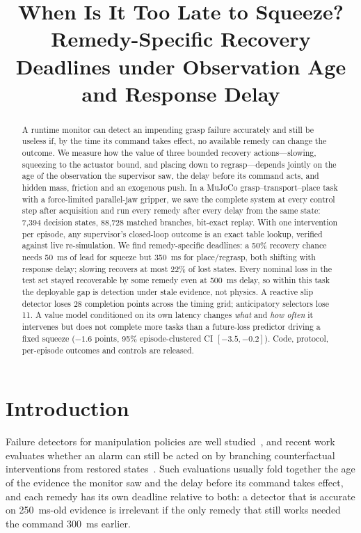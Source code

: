 \documentclass[conference]{IEEEtran}
\begin{document}
\title{When Is It Too Late to Squeeze?\\
Remedy-Specific Recovery Deadlines under Observation Age and Response Delay}

\author{}

\maketitle

\begin{abstract}
A runtime monitor can detect an impending grasp failure accurately and still be useless if, by the time its command takes effect, no available remedy can change the outcome. We measure how the value of three bounded recovery actions---slowing, squeezing to the actuator bound, and placing down to regrasp---depends jointly on the age of the observation the supervisor saw, the delay before its command acts, and hidden mass, friction and an exogenous push. In a MuJoCo grasp--transport--place task with a force-limited parallel-jaw gripper, we save the complete system at every control step after acquisition and run every remedy after every delay from the same state: 7{,}394 decision states, 88{,}728 matched branches, bit-exact replay. With one intervention per episode, any supervisor's closed-loop outcome is an exact table lookup, verified against live re-simulation. We find remedy-specific deadlines: a 50\% recovery chance needs 50~ms of lead for squeeze but 350~ms for place/regrasp, both shifting with response delay; slowing recovers at most 22\% of lost states. Every nominal loss in the test set stayed recoverable by some remedy even at 500~ms delay, so within this task the deployable gap is detection under stale evidence, not physics. A reactive slip detector loses 28 completion points across the timing grid; anticipatory selectors lose 11. A value model conditioned on its own latency changes \emph{what} and \emph{how often} it intervenes but does not complete more tasks than a future-loss predictor driving a fixed squeeze ($-1.6$ points, 95\% episode-clustered CI $[-3.5,-0.2]$). Code, protocol, per-episode outcomes and controls are released.
\end{abstract}

\section{Introduction}
Failure detectors for manipulation policies are well studied~\cite{faildetect,safe}, and recent work evaluates whether an alarm can still be acted on by branching counterfactual interventions from restored states~\cite{rescue,checkvla,prefail}. Such evaluations usually fold together the age of the evidence the monitor saw and the delay before its command takes effect, and each remedy has its own deadline relative to both: a detector that is accurate on 250~ms-old evidence is irrelevant if the only remedy that still works needed the command 300~ms earlier.
\end{document}
